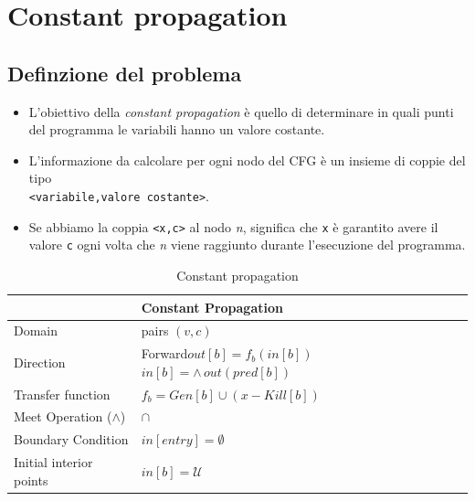 \documentclass[10pt,a4paper]{article}
\begin{document}
\newpage
\section{Constant propagation}

\subsection{Definzione del problema}

\begin{itemize}
  \item L'obiettivo della \textit{constant propagation} \`e quello di determinare in quali punti del programma le variabili hanno un valore costante.
  \item L'informazione da calcolare per ogni nodo del CFG \`e un insieme di coppie del tipo\\\lstinline|<variabile,valore costante>|.
  \item Se abbiamo la coppia \lstinline|<x,c>| al nodo \textit{n}, significa che \lstinline|x| \`e garantito avere il valore \lstinline|c| ogni volta che \textit{n} viene raggiunto durante l'esecuzione del programma.
\end{itemize}


\begin{table}[h!]
  \centering
  \begin{tabular}{|l|p{4cm}|}
    \hline
    \textbf{} & \textbf{Constant Propagation} \\
    \hline
    Domain & pairs $(v,c)$\\
    \hline
    Direction & Forward\newline $out[b]=f_{b}(in[b])$ \newline $in[b] = \wedge\, out(pred[b])$ \\
    \hline
    Transfer function & $f_{b}=Gen[b] \cup (x - Kill[b])$ \\
    \hline
    Meet Operation (\(\land\)) & $\cap$\\
    \hline
    Boundary Condition & $in[entry]=\emptyset$ \\
    \hline
    Initial interior points & $in[b]=\mathcal{U}$ \\
    \hline
  \end{tabular}
  \caption{Constant propagation}
\end{table}
\end{document}
